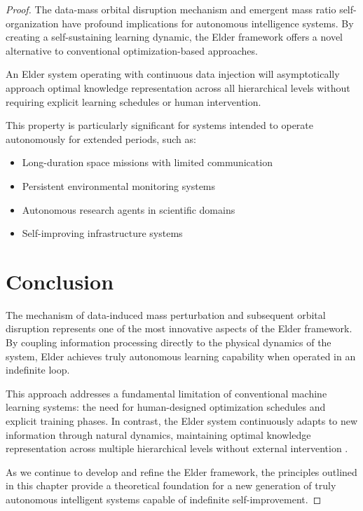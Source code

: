 \begin{proof}
The data-mass orbital disruption mechanism and emergent mass ratio self-organization have profound implications for autonomous intelligence systems. By creating a self-sustaining learning dynamic, the Elder framework offers a novel alternative to conventional optimization-based approaches.

\begin{theorem}
An Elder system operating with continuous data injection will asymptotically approach optimal knowledge representation across all hierarchical levels without requiring explicit learning schedules or human intervention.
\end{theorem}

This property is particularly significant for systems intended to operate autonomously for extended periods, such as:

\begin{itemize}
    \item Long-duration space missions with limited communication
    \item Persistent environmental monitoring systems
    \item Autonomous research agents in scientific domains
    \item Self-improving infrastructure systems
\end{itemize}

\section{Conclusion}

The mechanism of data-induced mass perturbation and subsequent orbital disruption represents one of the most innovative aspects of the Elder framework. By coupling information processing directly to the physical dynamics of the system, Elder achieves truly autonomous learning capability when operated in an indefinite loop.

This approach addresses a fundamental limitation of conventional machine learning systems: the need for human-designed optimization schedules and explicit training phases. In contrast, the Elder system continuously adapts to new information through natural dynamics, maintaining optimal knowledge representation across multiple hierarchical levels without external intervention \cite{autonomous_learning_systems}.

As we continue to develop and refine the Elder framework, the principles outlined in this chapter provide a theoretical foundation for a new generation of truly autonomous intelligent systems capable of indefinite self-improvement.


\end{proof}
